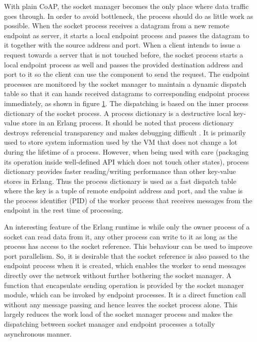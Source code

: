 With plain CoAP, the socket manager becomes the only place where data traffic goes through. In order to avoid bottleneck, the process should do as little work as possible. When the socket process receives a datagram from a new remote endpoint as server, it starts a local endpoint process and passes the datagram to it together with the source address and port. When a client intends to issue a request towards a server that is not touched before, the socket process starts a local endpoint process as well and passes the provided destination address and port to it so the client can use the component to send the request. The endpoint processes are monitored by the socket manager to maintain a dynamic dispatch table so that it can hands received datagrams to corresponding endpoint process immediately, as shown in figure \ref{fig:coap_socket_manager}. The dispatching is based on the inner process dictionary of the socket process. A process dictionary is a destructive local key-value store in an Erlang process. It should be noted that process dictionary destroys referencial transparency and makes debugging difficult \cite{}. It is primarily used to store system information used by the VM that does not change a lot during the lifetime of a process. However, when being used with care (packaging its operation inside well-defined API which does not touch other states), process dictionary provides faster reading/writing performance than other key-value stores in Erlang. Thus the process dictionary is used as a fast dispatch table where the key is a tuple of remote endpoint address and port, and the value is the process identifier (PID) of the worker process that receives messages from the endpoint in the rest time of processing. 

\begin{figure}
\label{fig:coap_socket_manager}
\end{figure}

An interesting feature of the Erlang runtime is while only the owner process of a socket can read data from it, any other process can write to it as long as the process has access to the socket reference. This behaviour can be used to improve port parallelism. So, it is desirable that the socket reference is also passed to the endpoint process when it is created, which enables the worker to send messages directly over the network without further bothering the socket manager. A function that encapsulate sending operation is provided by the socket manager module, which can be invoked by endpoint processes. It is a direct function call without any message passing and hence leaves the socket process alone. This largely reduces the work load of the socket manager process and makes the dispatching between socket manager and endpoint processes a totally asynchronous manner.

